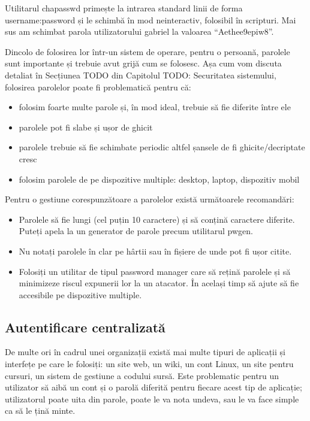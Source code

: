 Utilitarul chapasswd primește la intrarea standard linii de forma
username:password și le schimbă în mod neinteractiv, folosibil în scripturi. Mai
sus am schimbat parola utilizatorului gabriel la valoarea “Aethee9epiw8”.

Dincolo de folosirea lor într-un sistem de operare, pentru o persoană, parolele
sunt importante și trebuie avut grijă cum se folosesc. Așa cum vom discuta
detaliat în Secțiunea TODO din Capitolul TODO: Securitatea sistemului, folosirea
parolelor poate fi problematică pentru că:

\begin{itemize}
	\item folosim foarte multe parole și, în mod ideal, trebuie să fie
		diferite între ele
	\item parolele pot fi slabe și ușor de ghicit
	\item parolele trebuie să fie schimbate periodic altfel șansele de fi
		ghicite/decriptate cresc
	\item folosim parolele de pe dispozitive multiple: desktop, laptop,
		dispozitiv mobil
\end{itemize}

Pentru o gestiune corespunzătoare a parolelor există următoarele recomandări:

\begin{itemize}
	\item Parolele să fie lungi (cel puțin 10 caractere) și să conțină
		caractere diferite. Puteți apela la un generator de parole
		precum utilitarul pwgen.
	\item Nu notați parolele în clar pe hârtii sau în fișiere de unde pot fi
		ușor citite.
	\item Folosiți un utilitar de tipul password manager care să rețină
		parolele și să minimizeze riscul expunerii lor la un atacator.
		În același timp să ajute să fie accesibile pe dispozitive
		multiple.
\end{itemize}

\subsection{Autentificare centralizată}
\label{sec:users-auth-central}

De multe ori în cadrul unei organizații există mai multe tipuri de aplicații și
interfețe pe care le folosiți: un site web, un wiki, un cont Linux, un site
pentru cursuri, un sistem de gestiune a codului sursă. Este problematic pentru
un utilizator să aibă un cont și o parolă diferită pentru fiecare acest tip de
aplicație; utilizatorul poate uita din parole, poate le va nota undeva, sau le
va face simple ca să le țină minte.

